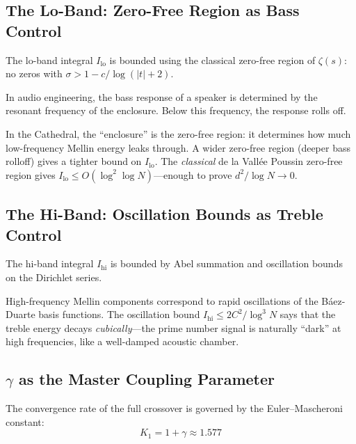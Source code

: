 \documentclass[11pt,a4paper]{article}
\begin{document}
\subsection{The Lo-Band: Zero-Free Region as Bass Control}

The lo-band integral $I_{\mathrm{lo}}$ is bounded using the
classical zero-free region of $\zeta(s)$: no zeros with
$\sigma > 1 - c/\log(|t|+2)$.

\begin{principle}[Bass Response = Zero-Free Region]
In audio engineering, the bass response of a speaker is
determined by the resonant frequency of the enclosure.
Below this frequency, the response rolls off.

In the Cathedral, the ``enclosure'' is the zero-free region:
it determines how much low-frequency Mellin energy leaks through.
A wider zero-free region (deeper bass rolloff) gives a tighter
bound on $I_{\mathrm{lo}}$. The \emph{classical} de la Vall\'ee
Poussin zero-free region gives
$I_{\mathrm{lo}} \leq O(\log^2 \log N)$---enough to prove
$d^2/\log N \to 0$.
\end{principle}

\subsection{The Hi-Band: Oscillation Bounds as Treble Control}

The hi-band integral $I_{\mathrm{hi}}$ is bounded by
Abel summation and oscillation bounds on the Dirichlet series.

\begin{principle}[Treble Response = Oscillation Damping]
High-frequency Mellin components correspond to rapid oscillations
of the B\'aez-Duarte basis functions. The oscillation bound
$I_{\mathrm{hi}} \leq 2C^2/\log^3 N$ says that the treble
energy decays \emph{cubically}---the prime number signal is
naturally ``dark'' at high frequencies, like a well-damped
acoustic chamber.
\end{principle}

\subsection{$\gamma$ as the Master Coupling Parameter}

The convergence rate of the full crossover is governed by the
Euler--Mascheroni constant:
\[
  K_1 = 1 + \gamma \approx 1.577
\]
\end{document}
